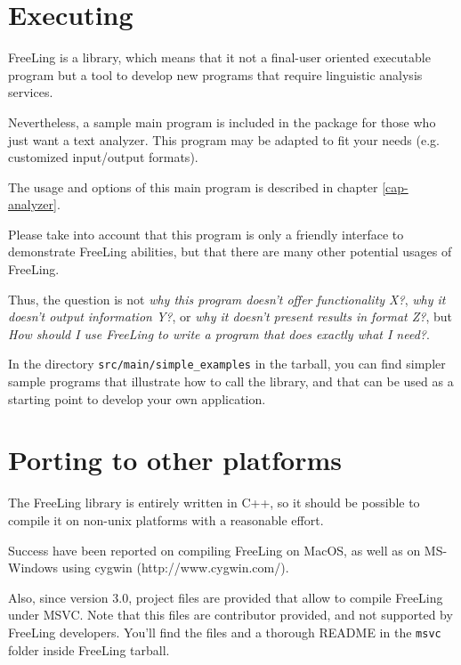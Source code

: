 \documentclass[a4paper]{book}
\begin{document}
\section{Executing}
\label{sec-execute}

  FreeLing is a library, which means that it not a final-user oriented
  executable program but a tool to develop new programs that
  require linguistic analysis services.

  Nevertheless, a sample main program is included in the package for
 those who just want a text analyzer. This program may 
 be adapted to fit your needs (e.g. customized input/output formats).
  
  The usage and options of this main program is described in chapter
  \ref{cap-analyzer}.
  
  Please take into account that this program is only a friendly
  interface to demonstrate FreeLing abilities, but that there are
  many other potential usages of FreeLing.  

  Thus, the question is not {\sl why this program doesn't offer
    functionality X?}, {\sl why it doesn't output information Y?}, or
  {\sl why it doesn't present results in format Z?}, but {\sl How should
    I use FreeLing to write a program that does exactly what I need?}.
    
  In the directory {\tt src/main/simple\_examples} in the tarball, you
 can find simpler sample programs that illustrate how to call the library, 
 and that can be used as a starting point to develop your own application.

\section{Porting to other platforms}

The FreeLing library is entirely written in C++, so it should be
possible to compile it on non-unix platforms with a reasonable
effort.

Success have been reported on compiling FreeLing on MacOS, as well as on
MS-Windows using cygwin (http://www.cygwin.com/).

Also, since version 3.0, project files are provided that allow
to compile FreeLing under MSVC. Note that this files are contributor
provided, and not supported by FreeLing developers. You'll find the
files and a thorough README in the {\tt msvc} folder inside FreeLing
tarball.
\end{document}
